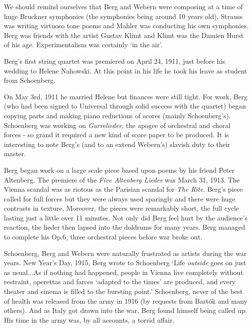 We should remind ourselves that Berg and Webern were composing at a time of huge Bruckner symphonies (the symphonies being around 10 years old), Strauss was writing virtuoso tone poems and Mahler was conducting his own symphonies. 
Berg was friends with the artist Gustav Klimt and Klimt was the Damien Hurst of his age. Experimentalism was certainly `in the air'.

Berg's first string quartet was premiered on April 24, 1911, just before his wedding to Helene Nahowski. At this point in his life he took his leave as student from Schoenberg. 

On May 3rd, 1911 he married Helene but finances were still tight. For work, Berg (who had been signed to Universal through solid success with the quartet) began copying parts and making piano reductions of scores (mainly Schoenberg's). Schoenberg was working on \textit{Gurrelieder}, the apogee of orchestral and choral forces - so grand it required a new kind of score paper to be produced. It is interesting to note Berg's (and to an extend Webern's) slavish duty to their master.  

Berg began work on a large scale piece based upon poems by his friend Peter Altenberg. The premiere of the \textit{Five Altenberg Lieder} was March 31, 1913. The Vienna scandal was as riotous as the Parisian scandal for \textit{The Rite}. Berg's piece called for full forces but they were always used sparingly and there were huge contrasts in texture. Moreover, the pieces were remarkably short, the full cycle lasting just a little over 11 minutes. Not only did Berg feel hurt by the audience's reaction, the lieder then lapsed into the doldrums for many years. Berg managed to complete his Op.6, three orchestral pieces before war broke out. 

Schoenberg, Berg and Webern were naturally frustrated as artists during the war years. New Year's Day, 1915, Berg wrote to Schoenberg `Life \textit{outside} goes on just as usual...As if nothing had happened, people in Vienna live completely without restraint, operettas and farces `adapted to the times' are produced, and every theater and cinema is filled to the bursting point.' Schoenberg, never of the best of health was released from the army in 1916 (by requests from Bart\'ok and many others). And as Italy got drawn into the war, Berg found himself being called up. His time in the army was, by all accounts, a torrid affair.  

